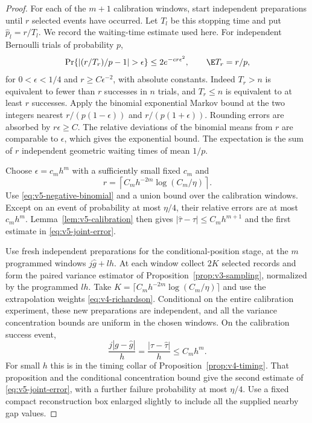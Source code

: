 \begin{proof}
For each of the $m+1$ calibration windows, start independent preparations
until $r$ selected events have occurred. Let $T_l$ be this stopping time
and put $\widehat p_l=r/T_l$. We record the waiting-time estimate used
here. For independent Bernoulli trials of probability $p$,
\begin{equation}\label{eq:v5-negative-binomial}
 \Pr\{|(r/T_r)/p-1|>\epsilon\}
                    \le 2e^{-c r\epsilon^2},\qquad
 \E T_r=r/p,
\end{equation}
for $0<\epsilon<1/4$ and $r\ge C\epsilon^{-2}$, with absolute
constants. Indeed $T_r>n$ is equivalent to fewer than $r$ successes
in $n$ trials, and $T_r\le n$ is equivalent to at least $r$ successes.
Apply the binomial exponential Markov bound at the two integers nearest
$r/(p(1-\epsilon))$ and $r/(p(1+\epsilon))$. Rounding errors are absorbed
by $r\epsilon\ge C$. The relative deviations of the binomial means
from $r$ are comparable to $\epsilon$, which gives the exponential
bound. The expectation is the sum of $r$ independent geometric waiting
times of mean $1/p$.

Choose $\epsilon=c_mh^m$ with a sufficiently small fixed $c_m$ and
\[
       r=\left\lceil C_mh^{-2m}\log(C_m/\eta)\right\rceil.
\]
Use \eqref{eq:v5-negative-binomial} and a union bound over the calibration
windows. Except on an event of probability at most $\eta/4$, their
relative errors are at most $c_mh^m$. Lemma~\ref{lem:v5-calibration}
then gives $|\widehat\tau-\tau|\le C_mh^{m+1}$ and the first estimate
in \eqref{eq:v5-joint-error}.

Use fresh independent preparations for the conditional-position stage,
at the $m$ programmed windows $j\widehat g+lh$. At each window collect
$2K$ selected records and form the paired variance estimator of
Proposition~\ref{prop:v3-sampling}, normalized by the programmed $lh$.
Take
$K=\lceil C_mh^{-2m}\log(C_m/\eta)\rceil$ and use the extrapolation
weights \eqref{eq:v4-richardson}. Conditional on the entire calibration
experiment, these new preparations are independent, and all the
variance concentration bounds are uniform in the chosen windows.
On the calibration success event,
\[
 \frac{j|g-\widehat g|}{h}=\frac{|\tau-\widehat\tau|}{h}
                                                     \le C_mh^m.
\]
For small $h$ this is in the timing collar of
Proposition~\ref{prop:v4-timing}. That proposition and the conditional
concentration bound give the second estimate of
\eqref{eq:v5-joint-error}, with a further failure probability at most
$\eta/4$. Use a fixed compact reconstruction box enlarged slightly to
include all the supplied nearby gap values.


\end{proof}

